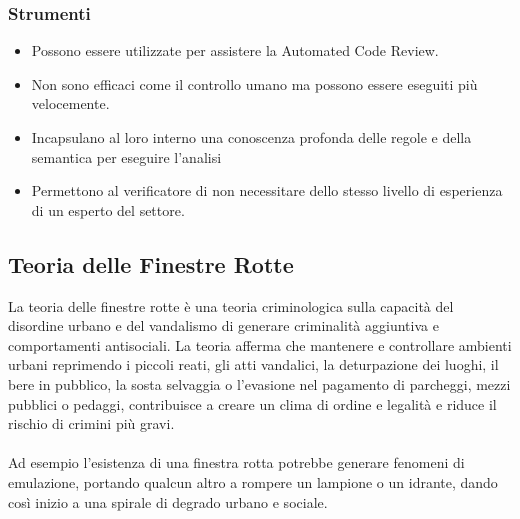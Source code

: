 \subsubsection{Strumenti}
\begin{itemize}
    \item Possono essere utilizzate per assistere la Automated Code Review.
    \item Non sono efficaci come il controllo umano ma possono essere eseguiti più velocemente. 
    \item Incapsulano al loro interno una conoscenza profonda delle regole e della semantica per eseguire l'analisi
    \item Permettono al verificatore di non necessitare dello stesso livello di esperienza di un esperto del settore.
\end{itemize}

\subsection{Teoria delle Finestre Rotte}
La teoria delle finestre rotte è una teoria criminologica sulla capacità del disordine urbano e del vandalismo di generare criminalità aggiuntiva e comportamenti antisociali.
La teoria afferma che mantenere e controllare ambienti urbani reprimendo i piccoli reati, gli atti vandalici, la deturpazione dei luoghi, il bere in pubblico, la sosta selvaggia o l'evasione nel pagamento di parcheggi, mezzi pubblici o pedaggi, contribuisce a creare un clima di ordine e legalità e riduce il rischio di crimini più gravi. \\ \\
Ad esempio l'esistenza di una finestra rotta potrebbe generare fenomeni di emulazione, portando qualcun altro a rompere un lampione o un idrante, dando così inizio a una spirale di degrado urbano e sociale.

